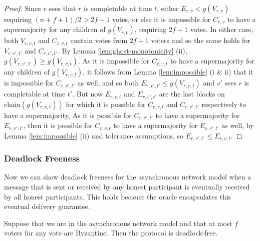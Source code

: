 \documentclass[a4paper,UKenglish,cleveref, autoref, thm-restate, anonymous]{lipics-v2019}
\begin{document}
\begin{proof} 
Since $v$ sees that $r$ is completable at time $t$, 
either $E_{r,v} < g(V_{r,v})$ requiring $(n+f+1)/2 > 2f + 1$ votes, or else it is impossible for $C_{r,v}$ to have a supermajority for any children of $g(V_{r,v})$, requiring $2f + 1$ votes.
In either case, both $V_{r,v,t}$ and $C_{r,v,t}$ contain votes from $2f + 1$ voters and so the same holds for $V_{r,v',t'}$ and $C_{r,v',t'}$. 
By Lemma \ref{lem:ghost-monotonicity} (ii), $g(V_{r,v',t'}) \geq g(V_{r,v,t})$.
As it is impossible for $C_{r,v,t}$ to have a supermajority for any children of $g(V_{r,v,t})$, it follows from Lemma \ref{lem:impossible} (i \& ii) that it is impossible for $C_{r,v',t'}$ as well, and so both $E_{r,v',t'} \leq g(V_{r,v,t})$ and $v'$ sees $r$ is completable at time $t'$.
But now $E_{r,v,t}$ and $E_{r,v',t'}$ are the last blocks on $\textrm{chain}(g(V_{r,v,t}))$ for which it is possible for $C_{r,v,t}$ and $C_{r,v',t'}$ respectively to have a supermajority, 
As it is possible for $C_{r,v',t'}$ to have a supermajority for $E_{r,v',t'}$, then it is possible for $C_{r,v,t}$ to have a supermajority for $E_{r,v',t'}$ as well, by Lemma \ref{lem:impossible} (ii) and tolerance assumptions, so $E_{r,v',t'} \leq E_{r,v,t}$.
\end{proof}
 
\subsubsection{Deadlock Freeness}

Now we can show deadlock freeness for the asynchronous network model when a message that is sent or received by any honest participant is eventually received by all honest participants. This holds because the oracle encapsulates this eventual delivery guarantee.

\begin{proposition} Suppose that we are in the asynchronous network model and that at most $f$ voters for any vote are Byzantine. Then the protocol is deadlock-free.\end{proposition}
\end{document}
